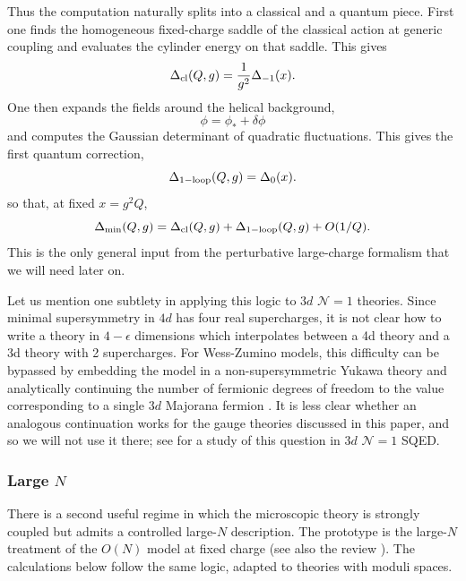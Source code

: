 \documentclass[a4paper,11pt]{article}
\newcommand\Dm{\Delta_{\min}}
\begin{document}
Thus the computation naturally splits into a classical and a quantum piece. First one finds the homogeneous fixed-charge saddle of the classical action at generic coupling and evaluates the cylinder energy on that saddle. This gives
\begin{equation}
  \Delta_{\rm cl}(Q,g) = \frac{1}{g^2}\Delta_{-1}(x).
\end{equation}
One then expands the fields around the helical background,
\begin{equation}
  \phi=\phi_*+\delta\phi
\end{equation}
and computes the Gaussian determinant of quadratic fluctuations. This gives the first quantum correction,
\begin{equation}
  \Delta_{\rm 1-loop}(Q,g) = \Delta_0(x).
\end{equation}
so that, at fixed $x=g^2Q$,
\begin{equation}
  \Dm(Q,g) = \Delta_{\rm cl}(Q,g)+\Delta_{\rm 1-loop}(Q,g)+O(1/Q).
\end{equation}
This is the only general input from the perturbative large-charge formalism that we will need later on.

Let us mention one subtlety in applying this logic to $3d$ $\mathcal N=1$ theories. Since minimal supersymmetry in $4d$ has four real supercharges, it is not clear how to write a theory in $4-\epsilon$ dimensions which interpolates between a 4d theory and a 3d theory with 2 supercharges. For Wess-Zumino models, this difficulty can be bypassed by embedding the model in a non-supersymmetric Yukawa theory and analytically continuing the number of fermionic degrees of freedom to the value corresponding to a single $3d$ Majorana fermion \cite{Fei:2016sgs,ThomasSeminar}.  It is less clear whether an analogous continuation works for the gauge theories discussed in this paper, and so we will not use it there; see \cite{Breitstein:2024pwi} for a study of this question in $3d$ $\mathcal N=1$ SQED.

\subsubsection{Large $N$}

There is a second useful regime in which the microscopic theory is strongly coupled but admits a controlled large-$N$ description. The prototype is the large-$N$ treatment of the $O(N)$ model at fixed charge \cite{Alvarez-Gaume:2019biu,Giombi:2020enj} (see also the review \cite{Gaume:2020bmp}). The calculations below follow the same logic, adapted to theories with moduli spaces.
\end{document}
